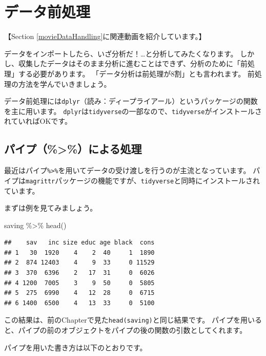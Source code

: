 \documentclass[
]{book}
\newenvironment{Shaded}{\begin{snugshade}}{\end{snugshade}}
\newcommand{\FunctionTok}[1]{\textcolor[rgb]{0.00,0.00,0.00}{#1}}
\newcommand{\NormalTok}[1]{#1}
\newcommand{\SpecialCharTok}[1]{\textcolor[rgb]{0.00,0.00,0.00}{#1}}
\begin{document}
\hypertarget{DataHandling}{%
\chapter{データ前処理}\label{DataHandling}}

【Section \ref{movieDataHandling}に関連動画を紹介しています。】

データをインポートしたら、いざ分析だ！\ldots と分析してみたくなります。
しかし、収集したデータはそのまま分析に進むことはできず、分析のために「前処理」する必要があります。
「データ分析は前処理が8割」とも言われます。
前処理の方法を学んでいきましょう。

データ前処理には\texttt{dplyr}（読み：ディープライアール）というパッケージの関数を主に用います。
\texttt{dplyr}は\texttt{tidyverse}の一部なので、\texttt{tidyverse}がインストールされていればOKです。

\hypertarget{ux30d1ux30a4ux30d7ux306bux3088ux308bux51e6ux7406}{%
\section{パイプ（\%\textgreater\%）による処理}\label{ux30d1ux30a4ux30d7ux306bux3088ux308bux51e6ux7406}}

最近はパイプ\texttt{\%\textgreater{}\%}を用いてデータの受け渡しを行うのが主流となっています。
パイプは\texttt{magrittr}パッケージの機能ですが、\texttt{tidyverse}と同時にインストールされています。

まずは例を見てみましょう。

\begin{Shaded}
\begin{Highlighting}[]
\NormalTok{saving }\SpecialCharTok{\%\textgreater{}\%} \FunctionTok{head}\NormalTok{()}
\end{Highlighting}
\end{Shaded}

\begin{verbatim}
##    sav   inc size educ age black  cons
## 1   30  1920    4    2  40     1  1890
## 2  874 12403    4    9  33     0 11529
## 3  370  6396    2   17  31     0  6026
## 4 1200  7005    3    9  50     0  5805
## 5  275  6990    4   12  28     0  6715
## 6 1400  6500    4   13  33     0  5100
\end{verbatim}

この結果は、前のChapterで見た\texttt{head(saving)}と同じ結果です。
パイプを用いると、パイプの前のオブジェクトをパイプの後の関数の引数としてくれます。

パイプを用いた書き方は以下のとおりです。
\end{document}
